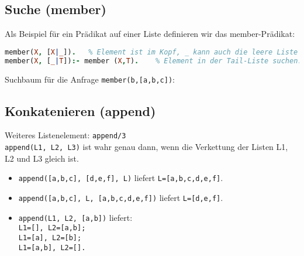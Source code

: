 \subsection{Suche (member)}
Als Beispiel für ein Prädikat auf einer Liste definieren wir das member-Prädikat:
\begin{lstlisting}[language=Prolog]
member(X, [X|_]).	% Element ist im Kopf, _ kann auch die leere Liste sein.
member(X, [_|T]):- member (X,T).	% Element in der Tail-Liste suchen.
\end{lstlisting}
 Suchbaum für die Anfrage \lstinline$member(b,[a,b,c])$:
\begin{center}
\end{center}

\subsection{Konkatenieren (append)}
Weiteres Listenelement: \lstinline$append/3$\\
\lstinline$append(L1, L2, L3)$ ist wahr genau dann, wenn die Verkettung der Listen L1, L2 und L3 gleich ist.
\begin{itemize}
\item \lstinline$append([a,b,c], [d,e,f], L)$ liefert \lstinline$L=[a,b,c,d,e,f]$.
\item \lstinline$append([a,b,c], L, [a,b,c,d,e,f])$ liefert \lstinline$L=[d,e,f]$.
\item \lstinline$append(L1, L2, [a,b])$ liefert:\\
\lstinline$L1=[], L2=[a,b];$\\
\lstinline$L1=[a], L2=[b];$\\
\lstinline$L1=[a,b], L2=[].$
\end{itemize}














